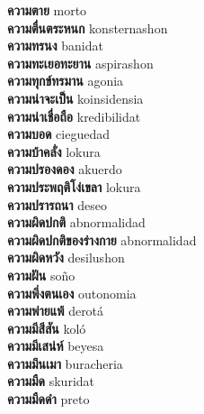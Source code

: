 \textbf{ ความตาย  } morto \\
\textbf{ ความตื่นตระหนก  } konsternashon \\
\textbf{ ความทรนง  } banidat \\
\textbf{ ความทะเยอทะยาน  } aspirashon \\
\textbf{ ความทุกข์ทรมาน  } agonia \\
\textbf{ ความน่าจะเป็น  } koinsidensia \\
\textbf{ ความน่าเชื่อถือ  } kredibilidat \\
\textbf{ ความบอด  } cieguedad \\
\textbf{ ความบ้าคลั่ง  } lokura \\
\textbf{ ความปรองดอง  } akuerdo \\
\textbf{ ความประพฤติโง่เขลา  } lokura \\
\textbf{ ความปรารถนา  } deseo \\
\textbf{ ความผิดปกติ  } abnormalidad \\
\textbf{ ความผิดปกติของร่างกาย  } abnormalidad \\
\textbf{ ความผิดหวัง  } desilushon \\
\textbf{ ความฝัน  } soño \\
\textbf{ ความพึ่งตนเอง  } outonomia \\
\textbf{ ความพ่ายแพ้  } derotá \\
\textbf{ ความมีสีสัน  } koló \\
\textbf{ ความมีเสน่ห์  } beyesa \\
\textbf{ ความมึนเมา  } buracheria \\
\textbf{ ความมืด  } skuridat \\
\textbf{ ความมืดดำ  } preto \\
